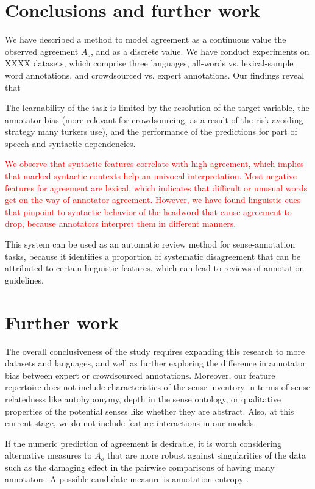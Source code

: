 \documentclass[11pt,a4paper]{article}
\begin{document}
\section{Conclusions and further work}

We have described a method to model agreement as a continuous value  the observed agreement $A_o$, and as a discrete value. We have conduct experiments on XXXX datasets, which comprise three languages, all-words vs. lexical-sample word annotations, and crowdsourced vs. expert annotations. Our findings reveal that 

 The learnability of the task is limited by the resolution of the target variable, the annotator bias (more relevant for crowdsourcing, as a result of the risk-avoiding strategy many turkers use), and the performance of the predictions for part of speech and syntactic dependencies.


\textcolor{red}{We observe that syntactic features correlate with high agreement, which implies that marked syntactic contexts help an univocal interpretation. Most negative features for agreement are lexical, which indicates that difficult or unusual words get on the way of annotator agreement. However, we have found linguistic cues that pinpoint to syntactic behavior of the headword that cause agreement to drop, because annotators interpret them in different manners. }

This system can be used as an automatic review method for sense-annotation tasks, because it identifies a proportion of systematic disagreement that can be attributed to certain linguistic features, which can lead to reviews of annotation guidelines. 


\section{Further work}
The overall conclusiveness of the study requires expanding this research to more datasets and languages, and well as further exploring the difference in annotator bias between  expert or crowdsourced annotations. Moreover, our feature repertoire does not include characteristics of the sense inventory in terms of sense relatedness like autohyponymy, depth in the sense ontology, or qualitative properties of the potential senses like whether they are abstract. Also, at this current stage, we do not include feature interactions in our models.

If the numeric prediction of agreement is desirable, it is worth considering alternative measures to $A_o$ that are more robust against singularities of the data such as the damaging effect in the pairwise comparisons of having many annotators. A possible candidate measure is annotation entropy \cite{Yarowsky2002}.



\end{document}
